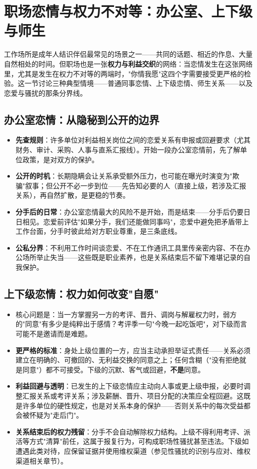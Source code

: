 \section{职场恋情与权力不对等：办公室、上下级与师生}

工作场所是成年人结识伴侣最常见的场景之一——共同的话题、相近的作息、大量自然相处的时间。但职场也是一张\textbf{权力与利益交织}的网络：当恋情发生在这张网络里，尤其是发生在权力不对等的两端时，"你情我愿"这四个字需要接受更严格的检验。这一节讨论三种典型情境——普通同事恋情、上下级恋情、师生关系——以及恋爱与骚扰的那条分界线。

\subsection{办公室恋情：从隐秘到公开的边界}

\begin{itemize}
\item \textbf{先查规则}：许多单位对利益相关岗位之间的恋爱关系有申报或回避要求（尤其财务、审计、采购、人事与直系汇报线）。开始一段办公室恋情前，先了解单位政策，是对双方的保护。
\item \textbf{公开的时机}：长期隐瞒会让关系承受额外压力，也可能在曝光时演变为"欺骗"叙事；但公开不必一步到位——先告知必要的人（直接上级，若涉及汇报关系），再自然扩散，是更稳的节奏。
\item \textbf{分手后的日常}：办公室恋情最大的风险不是开始，而是结束——分手后仍要日日相见。恋爱前评估"如果分手，我们还能做同事吗"，恋爱中避免把矛盾带上工作台面，分手时彼此给对方职业尊重，是三条底线。
\item \textbf{公私分界}：不利用工作时间谈恋爱、不在工作通讯工具里传亲密内容、不在办公场所举止失当——这些既是职业素养，也是关系结束后不留下难堪记录的自我保护。
\end{itemize}

\subsection{上下级恋情：权力如何改变"自愿"}

\begin{itemize}
\item 核心问题是：当一方掌握另一方的考评、晋升、调岗与解雇权力时，弱方的"同意"有多少是纯粹出于感情？考评季一句"今晚一起吃饭吧"，对下级而言可能不是邀请而是难题。
\item \textbf{更严格的标准}：身处上级位置的一方，应当主动承担举证式责任——关系必须建立在明确的、可撤回的、无利益交换的同意之上；任何含糊（"没有拒绝就是同意"）都不可接受。下级的沉默、客气或回避，\textbf{不是}同意。
\item \textbf{利益回避与透明}：已发生的上下级恋情应主动向人事或更上级申报，必要时调整汇报关系或考评关系；涉及薪酬、晋升、项目分配的决策应全程回避。这既是许多单位的硬性规定，也是对关系本身的保护——否则关系中的每次受益都会被怀疑为"走后门"。
\item \textbf{关系结束后的权力残留}：分手不会自动解除权力结构。上级不得利用考评、派活等方式"清算"前任，这属于报复行为，可构成职场性骚扰甚至违法。下级如遭遇此类对待，应保留证据并使用维权渠道（参见性骚扰的识别与应对、维权渠道相关章节）。
\end{itemize}

